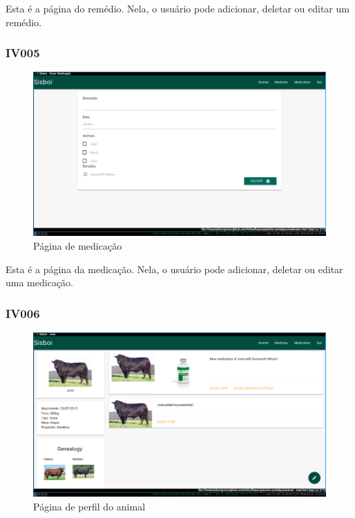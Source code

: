 \documentclass[12pt]{article}
\begin{document}
    Esta é a página do remédio. Nela, o usuário pode adicionar, deletar ou editar um remédio.

	\newpage

	\subsubsection{IV005}

	\begin{figure}[!h]
		\begin{center}
			\caption{Página de medicação}
			\includegraphics[width=13cm]{img/prototipos/medicacao.png}


		\end{center}
	\end{figure}
    
    Esta é a página da medicação. Nela, o usuário pode adicionar, deletar ou editar uma medicação.

	\subsubsection{IV006}

	\begin{figure}[!h]
		\begin{center}
			\caption{Página de perfil do animal}
			\includegraphics[width=13cm]{img/prototipos/perfil.png}


		\end{center}
	\end{figure}
    
\end{document}

